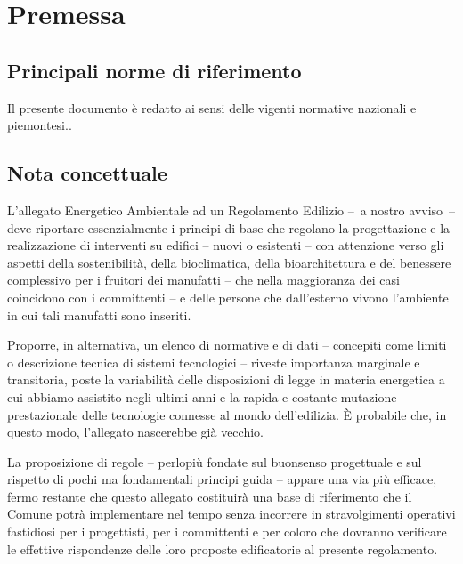 
\chapter{Premessa}
\label{chp:premessa}

\section{Principali norme di riferimento}
\label{sec:norme-riferimento-princ}

Il presente documento è redatto ai sensi delle vigenti normative nazionali e piemontesi..


\section{Nota concettuale}
\label{sec:nota-import}

L'allegato Energetico Ambientale ad un Regolamento Edilizio –~a nostro avviso~– deve riportare essenzialmente i principi di base che regolano la progettazione e la realizzazione di interventi su edifici – nuovi o esistenti – con attenzione verso gli aspetti della sostenibilità, della bioclimatica, della bioarchitettura e del benessere complessivo per i fruitori dei manufatti  – che nella maggioranza dei casi coincidono con i committenti – e delle persone che dall'esterno vivono l'ambiente in cui tali manufatti sono inseriti.

Proporre, in alternativa, un elenco di normative e di dati – concepiti come limiti o descrizione tecnica di sistemi tecnologici – riveste importanza marginale e transitoria, poste la variabilità delle disposizioni di legge in materia energetica a cui abbiamo assistito negli ultimi anni e la rapida e costante mutazione prestazionale delle tecnologie connesse al mondo dell'edilizia. È probabile che, in questo modo, l'allegato nascerebbe già vecchio. 

\noindent La proposizione di regole – perlopiù fondate sul buonsenso progettuale e sul rispetto di pochi ma fondamentali principi guida – appare una via più efficace,  fermo restante che questo allegato costituirà una base di riferimento che il Comune potrà implementare  nel tempo senza incorrere in stravolgimenti operativi fastidiosi per i progettisti, per i committenti e per coloro che dovranno verificare le effettive rispondenze delle loro proposte edificatorie al presente regolamento.




